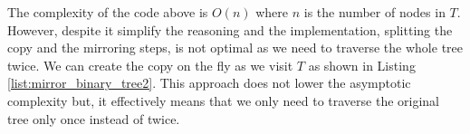 The complexity of the code above is $O(n)$ where $n$ is the number of nodes in $T$.
However, despite it simplify the reasoning and the implementation,
splitting the copy and the mirroring steps, is not optimal as we need to traverse the whole tree twice. 
We can create the copy on the fly as we visit $T$ as shown in Listing \ref{list:mirror_binary_tree2}. 
This approach does not lower the asymptotic complexity but, it effectively means that 
we only need to traverse the original tree only once instead of twice. 




